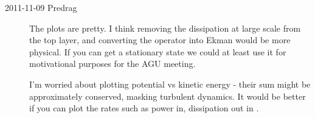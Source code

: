 \begin{description}
\item[2011-11-09 Predrag] The plots are pretty. I think removing the
dissipation at large scale from the top layer, and converting the
operator into Ekman would be more physical. If you can get a stationary
state we could at least use it for motivational purposes for the AGU
meeting.

I'm worried about plotting potential vs kinetic energy - their sum might
be approximately conserved, masking turbulent dynamics. It would be
better if you can plot the rates such as power in, dissipation out in
.

\end{description}
